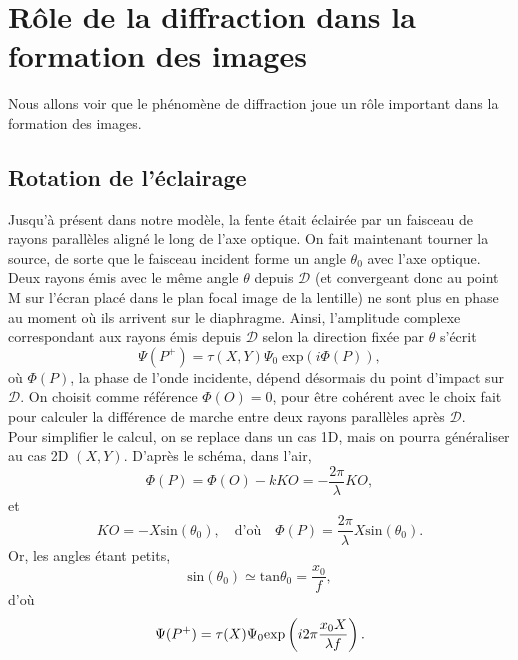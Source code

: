 \documentclass[11pt,a4paper]{report}
\begin{document}
\section{Rôle de la diffraction dans la formation des images}

Nous allons voir que le phénomène de diffraction joue un rôle important dans la formation des images.

\subsection{Rotation de l'éclairage}

Jusqu'à présent dans notre modèle, la fente était éclairée par un faisceau de rayons parallèles aligné le long de l'axe optique. On fait maintenant tourner la source, de sorte que le faisceau incident forme un angle $\theta_0$ avec l'axe optique. Deux rayons émis avec le même angle $\theta$ depuis $\mathcal{D}$ (et convergeant donc au point M sur l'écran placé dans le plan focal image de la lentille) ne sont plus en phase au moment où ils arrivent sur le diaphragme. Ainsi, l'amplitude complexe correspondant aux rayons émis depuis $\mathcal{D}$ selon la direction fixée par $\theta$ s'écrit
\begin{equation}
	\Psi(P^+) = \tau(X,Y)\Psi_0 \;\text{exp}\left(i\Phi(P)\right),
\end{equation}
où $\Phi(P)$, la phase de l'onde incidente, dépend désormais du point d'impact sur $\mathcal{D}$. On choisit comme référence $\Phi(O) = 0$, pour être cohérent avec le choix fait pour calculer la différence de marche entre deux rayons parallèles après $\mathcal{D}$.\\

Pour simplifier le calcul, on se replace dans un cas 1D, mais on pourra généraliser au cas 2D $(X,Y)$. D'après le schéma, dans l'air,
\begin{equation}
	\Phi(P) = \Phi(O) - k KO = - \frac{2\pi}{\lambda}KO,
\end{equation}
et
\begin{equation}
	KO = - X \text{sin}(\theta_0), \quad\text{d'où}\quad \Phi(P) = \frac{2\pi}{\lambda} X \text{sin}(\theta_0).
\end{equation}
Or, les angles étant petits,
\begin{equation}
	\text{sin}(\theta_0) \simeq \text{tan}\theta_0 = \frac{x_0}{f},
\end{equation}
d'où
\begin{equation}
	\Psi(P^+) = \tau(X)\Psi_0 \text{exp}\left(i2\pi\frac{x_0 X}{\lambda f}\right).\\
\end{equation}
\end{document}
